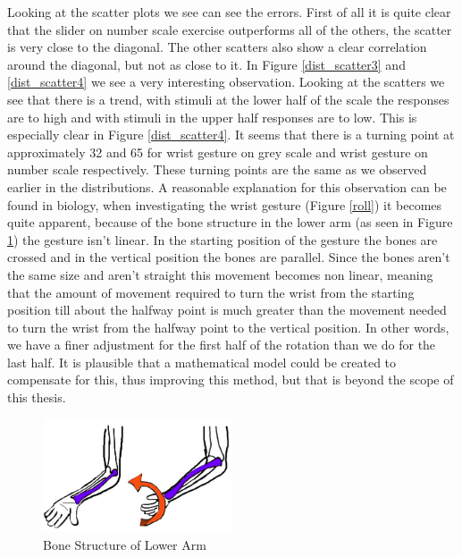 Looking at the scatter plots we see can see the errors. First of all it is quite clear that the slider on number scale exercise outperforms all of the others, the scatter is very close to the diagonal. The other scatters also show a clear correlation around the diagonal, but not as close to it. In Figure \ref{dist_scatter3} and \ref{dist_scatter4} we see a very interesting observation. Looking at the scatters we see that there is a trend, with stimuli at the lower half of the scale the responses are to high and with stimuli in the upper half responses are to low. This is especially clear in Figure \ref{dist_scatter4}. It seems that there is a turning point at approximately 32 and 65 for wrist gesture on grey scale and wrist gesture on number scale respectively. These turning points are the same as we observed earlier in the distributions. A reasonable explanation for this observation can be found in biology, when investigating the wrist gesture (Figure \ref{roll}) it becomes quite apparent, because of the bone structure in the lower arm (as seen in Figure \ref{bone}) the gesture isn't linear. In the starting position of the gesture the bones are crossed and in the vertical position the bones are parallel. Since the bones aren't the same size and aren't straight this movement becomes non linear, meaning that the amount of movement required to turn the wrist from the starting position till about the halfway point is much greater than the movement needed to turn the wrist from the halfway point to the vertical position. In other words, we have a finer adjustment for the first half of the rotation than we do for the last half. It is plausible that a mathematical model could be created to compensate for this, thus improving this method, but that is beyond the scope of this thesis.

\begin{figure}[h!]
    \centering
    \includegraphics[width=0.5\textwidth]{figures/bone.png}
    \caption{Bone Structure of Lower Arm\cite{bone}}
    \label{bone}
\end{figure}

